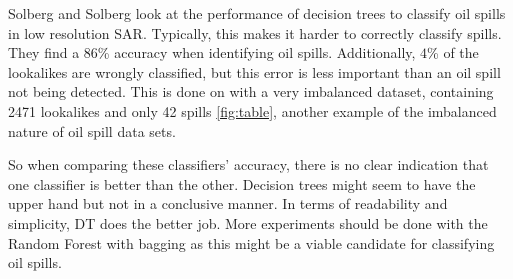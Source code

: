 
Solberg and Solberg \cite{Delfrate2004} look at the performance of decision trees to classify oil spills in low resolution SAR. Typically, this makes it harder to correctly classify spills. They find a $86$\% accuracy when identifying oil spills. Additionally, $4$\% of the lookalikes are wrongly classified, but this error is less important than an oil spill not being detected. This is done on with a very imbalanced dataset, containing 2471 lookalikes and only 42 spills \ref{fig:table}, another example of the imbalanced nature of oil spill data sets.

So when comparing these classifiers' accuracy, there is no clear indication that one classifier is better than the other. Decision trees might seem to have the upper hand but not in a conclusive manner. In terms of readability and simplicity, DT does the better job. More experiments should be done with the Random Forest with bagging as this might be a viable candidate for classifying oil spills.